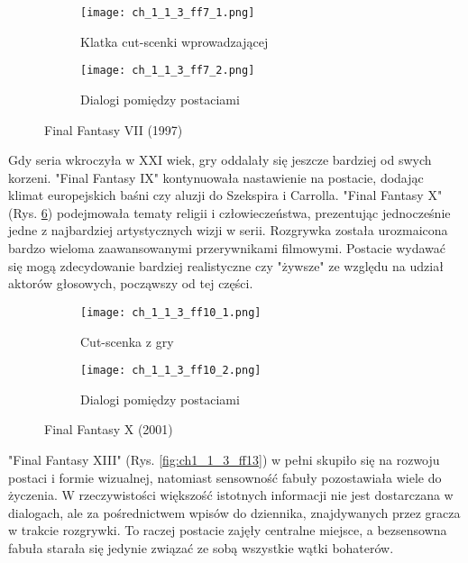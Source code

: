 \begin{figure}[h]
	\begin{subfigure}{0.49\textwidth}
		\caption{Klatka cut-scenki wprowadzającej}
		\texttt{[image: ch\_1\_1\_3\_ff7\_1.png]}
		\label{subfig:ch_1_1_3_ff7_1}
	\end{subfigure}
	\begin{subfigure}{0.49\textwidth}
		\caption{Dialogi pomiędzy postaciami}
		\texttt{[image: ch\_1\_1\_3\_ff7\_2.png]}
		\label{subfig:ch_1_1_3_ff7_2}
	\end{subfigure}
	\caption{Final Fantasy VII (1997)}
	\label{fig:ch1_1_3_ff7}
\end{figure}

\newpage

Gdy seria wkroczyła w XXI wiek, gry oddalały się jeszcze bardziej od swych korzeni. "Final Fantasy
IX" kontynuowała nastawienie na postacie, dodając klimat europejskich baśni czy aluzji do Szekspira i
Carrolla. "Final Fantasy X" (Rys. \ref{fig:ch1_1_3_ff10}) podejmowała tematy religii i człowieczeństwa,
prezentując jednocześnie jedne z najbardziej artystycznych wizji w serii\cite{the_evolution_of_final_fantasy}.
Rozgrywka została urozmaicona bardzo wieloma zaawansowanymi przerywnikami filmowymi. Postacie wydawać się
mogą zdecydowanie bardziej realistyczne czy "żywsze" ze względu na udział aktorów głosowych, począwszy
od tej części.

\begin{figure}[h]
	\begin{subfigure}{0.49\textwidth}
		\caption{Cut-scenka z gry}
		\texttt{[image: ch\_1\_1\_3\_ff10\_1.png]}
		\label{subfig:ch_1_1_3_ff10_1}
	\end{subfigure}
	\begin{subfigure}{0.49\textwidth}
		\caption{Dialogi pomiędzy postaciami}
		\texttt{[image: ch\_1\_1\_3\_ff10\_2.png]}
		\label{subfig:ch_1_1_3_ff10_2}
	\end{subfigure}
	\caption{Final Fantasy X (2001)}
	\label{fig:ch1_1_3_ff10}
\end{figure}

\newpage

"Final Fantasy XIII" (Rys. \ref{fig:ch1_1_3_ff13}) w pełni skupiło się na rozwoju postaci i
formie wizualnej, natomiast sensowność fabuły pozostawiała wiele do życzenia. W rzeczywistości większość
istotnych informacji nie jest dostarczana w dialogach, ale za pośrednictwem wpisów do dziennika,
znajdywanych przez gracza w trakcie rozgrywki. To raczej postacie zajęły centralne miejsce, a
bezsensowna fabuła starała się jedynie związać ze sobą wszystkie wątki
bohaterów\cite{the_evolution_of_final_fantasy}.

